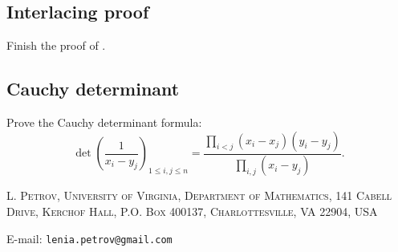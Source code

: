\documentclass[letterpaper,11pt,oneside,reqno]{article}
\numberwithin{equation}{section}
\theoremstyle{definition}
\begin{document}
\subsection{Interlacing proof}
\label{prob:interlacing}

Finish the proof of .

\subsection{Cauchy determinant}
\label{prob:cauchy}

Prove the Cauchy determinant formula:
\begin{equation*}
	\det\left( \frac{1}{x_i-y_j} \right)_{1\le i,j\le n}=
	\frac{\prod_{i<j}(x_i-x_j)(y_i-y_j)}{\prod_{i,j}(x_i-y_j)}.
\end{equation*}







\medskip

\textsc{L. Petrov, University of Virginia, Department of Mathematics, 141 Cabell Drive, Kerchof Hall, P.O. Box 400137, Charlottesville, VA 22904, USA}

E-mail: \texttt{lenia.petrov@gmail.com}
\end{document}
